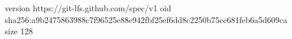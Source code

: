 version https://git-lfs.github.com/spec/v1
oid sha256:a9b2475863988c7f96525e88e942fbf25ef6dd8c2250b75cc681feb6a5d609ca
size 128
